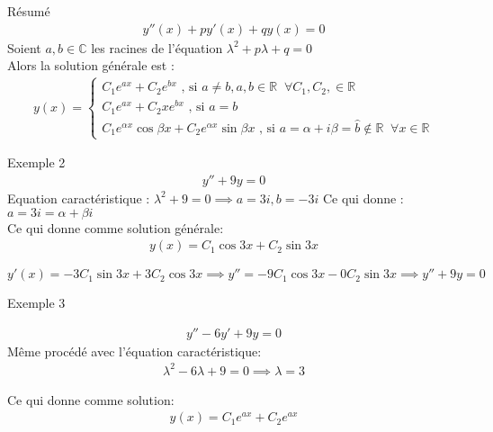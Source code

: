     \begin{parag}{Résumé}
        \begin{align*}
            y''(x) + py'(x) + q y(x) = 0
        \end{align*}
        Soient $a, b \in \mathbb{C}$ les racines de l'équation $ \lambda^2 + p \lambda + q = 0$
    \\
    Alors la solution générale est : 
    \begin{align*}
        y(x) = \begin{cases}
                C_1 e^{ax} + C_2 e^{bx} \text{ , si } a \neq b, a, b \in \mathbb{R} \; \; \forall C_1, C_2, \in \mathbb{R} \\
                C_1e^{ax} + C_2xe^{bx} \text{ , si } a = b \\
                C_1e^{ \alpha x} \cos \beta x + C_2 e^{ \alpha x} \sin \beta x \text{ , si } a = \alpha + i \beta = \hat{b} \notin \mathbb{R} \; \; \forall x \in \mathbb{R}
                            
        \end{cases}
    \end{align*}
    
    \begin{subparag}{Exemple 2}
       \begin{align*}
           y'' + 9y = 0
       \end{align*}
       Equation caractéristique : $ \lambda^2 + 9 = 0 \implies a = 3i, b = -3i$ Ce qui donne : $a = 3i = \alpha + \beta i$
       \\
       Ce qui donne comme solution générale:
       \begin{align*}
           y(x) = C_1 \cos 3x + C_2 \sin 3x
       \end{align*}
       
     $y'(x) = -3C_1\sin 3x + 3C_2\cos 3x \implies y'' = -9C_1 \cos 3x - 0 C_2 \sin 3x \implies y'' + 9y = 0$
    \end{subparag}
    \begin{subparag}{Exemple 3}
        
        \begin{align*}
            y'' -6y' + 9y = 0
        \end{align*}
        Même procédé avec l'équation caractéristique:
        \begin{align*}
            \lambda^2 - 6 \lambda + 9 = 0 \implies \lambda = 3
        \end{align*}
        
        Ce qui donne comme solution:
        \begin{align*}
            y(x) = C_1 e^{ ax} + C_2 e^{ax}
        \end{align*}
        
                
    \end{subparag}
    \end{parag}
    
